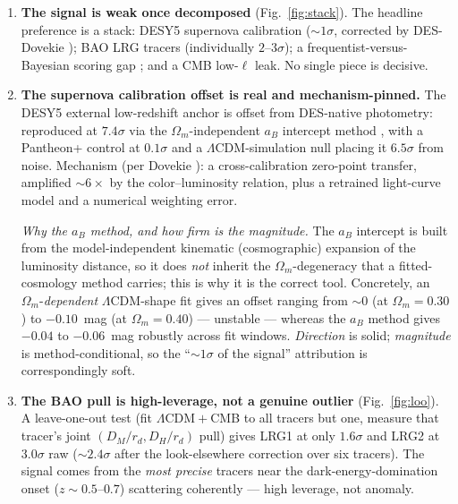 \documentclass[11pt]{article}
\newcommand{\LCDM}{$\Lambda$CDM}
\newcommand{\Om}{\ensuremath{\Omega_m}}
\newcommand{\Dmrd}{\ensuremath{D_M/r_d}}
\newcommand{\Dhrd}{\ensuremath{D_H/r_d}}
\begin{document}
\begin{enumerate}[leftmargin=1.3em,itemsep=0.5em]

\item \textbf{The signal is weak once decomposed} (Fig.~\ref{fig:stack}). The headline preference is a stack: DESY5 supernova calibration ($\sim\!1\sigma$, corrected by DES-Dovekie \cite{dovekie}); BAO LRG tracers (individually $2$--$3\sigma$); a frequentist-versus-Bayesian scoring gap \cite{bayes1}; and a CMB low-$\ell$ leak. No single piece is decisive.

\item \textbf{The supernova calibration offset is real and mechanism-pinned.} The DESY5 external low-redshift anchor is offset from DES-native photometry: reproduced at $7.4\sigma$ via the \Om-independent $a_B$ intercept method \cite{huang}, with a Pantheon+ control at $0.1\sigma$ and a \LCDM-simulation null placing it $6.5\sigma$ from noise. Mechanism (per Dovekie \cite{dovekie}): a cross-calibration zero-point transfer, amplified $\sim\!6\times$ by the color--luminosity relation, plus a retrained light-curve model and a numerical weighting error.

\begin{caveatbox}
\textit{Why the $a_B$ method, and how firm is the magnitude.} The $a_B$ intercept is built from the model-independent kinematic (cosmographic) expansion of the luminosity distance, so it does \emph{not} inherit the \Om-degeneracy that a fitted-cosmology method carries; this is why it is the correct tool. Concretely, an \Om-\emph{dependent} \LCDM-shape fit gives an offset ranging from $\sim\!0$ (at $\Om=0.30$) to $-0.10$~mag (at $\Om=0.40$) --- unstable --- whereas the $a_B$ method gives $-0.04$ to $-0.06$~mag robustly across fit windows. \emph{Direction} is solid; \emph{magnitude} is method-conditional, so the ``$\sim\!1\sigma$ of the signal'' attribution is correspondingly soft.
\end{caveatbox}

\item \textbf{The BAO pull is high-leverage, not a genuine outlier} (Fig.~\ref{fig:loo}). A leave-one-out test (fit \LCDM${}+{}$CMB to all tracers but one, measure that tracer's joint $(\Dmrd,\Dhrd)$ pull) gives LRG1 at only $1.6\sigma$ and LRG2 at $3.0\sigma$ raw ($\sim\!2.4\sigma$ after the look-elsewhere correction over six tracers). The signal comes from the \emph{most precise} tracers near the dark-energy-domination onset ($z\!\sim\!0.5$--$0.7$) scattering coherently --- high leverage, not anomaly.


\end{enumerate}
\end{document}
